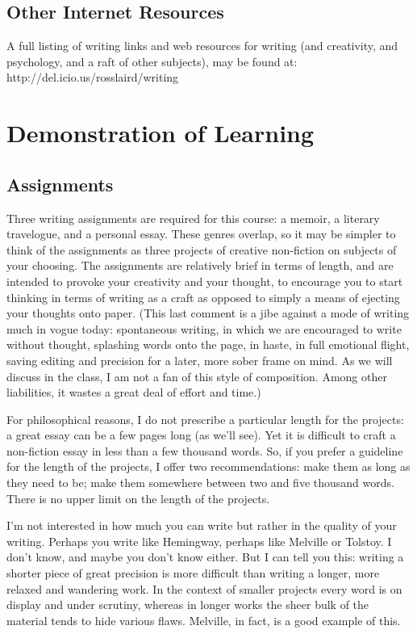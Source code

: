 \documentclass[letterpaper,10pt,headsepline]{scrreprt}
\begin{document}
\subsection{Other Internet Resources}
A full listing of writing links and web resources for writing (and creativity, and psychology, and a raft of other subjects), may be found at:\\
http://del.icio.us/rosslaird/writing


\clearpage

\section{Demonstration of Learning}

\subsection{Assignments}
Three writing assignments are required for this course: a memoir, a
literary travelogue, and a personal essay. These genres overlap, so it
may be simpler to think of the assignments as three projects of
creative non-fiction on subjects of your choosing. The assignments are
relatively brief in terms of length, and are intended to
provoke your creativity and your thought, to encourage you to start
thinking in terms of writing as a craft as opposed to simply a means
of ejecting your thoughts onto paper. (This last comment is a jibe
against a mode of writing much in vogue today: spontaneous writing, in
which we are encouraged to write without thought, splashing words onto
the page, in haste, in full emotional flight, saving editing and
precision for a later, more sober frame on mind. As we will discuss in
the class, I am not a fan of this style of composition. Among other
liabilities, it wastes a great deal of effort and time.)

For philosophical reasons, I do not prescribe a particular length for
the projects: a great essay can be a few pages long (as we'll see).
Yet it is difficult to craft a non-fiction essay in less than a few
thousand words. So, if you prefer a guideline for the length of the
projects, I offer two recommendations: make them as long as they
need to be; make them somewhere between two and five thousand words.
There is no upper limit on the length of the projects.

I'm not interested in how much you can write but rather in the quality
of your writing. Perhaps you write like Hemingway, perhaps like
Melville or Tolstoy. I don't know, and maybe you don't know either.
But I can tell you this: writing a shorter piece of great precision is
more difficult than writing a longer, more relaxed and wandering work.
In the context of smaller projects every word is on display and under
scrutiny, whereas in longer works the sheer bulk of the material tends
to hide various flaws. Melville, in fact, is a good example of this.
\end{document}
